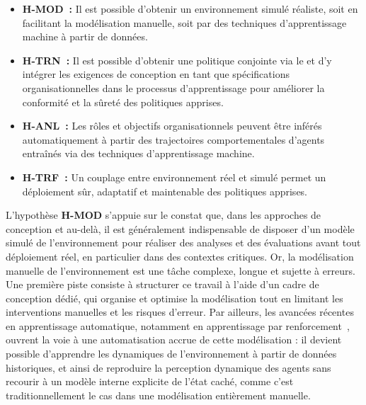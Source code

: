 \begin{itemize}
  \item \textbf{\textbf{H-MOD}~:} Il est possible d'obtenir un environnement simulé réaliste, soit en facilitant la modélisation manuelle, soit par des techniques d'apprentissage machine à partir de données.
  \item \textbf{\textbf{H-TRN}~:} Il est possible d'obtenir une politique conjointe via le  et d'y intégrer les exigences de conception en tant que spécifications organisationnelles dans le processus d'apprentissage pour améliorer la conformité et la sûreté des politiques apprises.
  \item \textbf{\textbf{H-ANL}~:} Les rôles et objectifs organisationnels peuvent être inférés automatiquement à partir des trajectoires comportementales d'agents entraînés via des techniques d'apprentissage machine.
  \item \textbf{\textbf{H-TRF}~:} Un couplage entre environnement réel et simulé permet un déploiement sûr, adaptatif et maintenable des politiques apprises.
\end{itemize}

\noindent L'hypothèse \textbf{H-MOD} s'appuie sur le constat que, dans les approches de conception  et au-delà, il est généralement indispensable de disposer d'un modèle simulé de l'environnement pour réaliser des analyses et des évaluations avant tout déploiement réel, en particulier dans des contextes critiques. Or, la modélisation manuelle de l'environnement est une tâche complexe, longue et sujette à erreurs. Une première piste consiste à structurer ce travail à l'aide d'un cadre de conception dédié, qui organise et optimise la modélisation tout en limitant les interventions manuelles et les risques d'erreur. Par ailleurs, les avancées récentes en apprentissage automatique, notamment en apprentissage par renforcement~\cite{ha2018recurrent}, ouvrent la voie à une automatisation accrue de cette modélisation : il devient possible d'apprendre les dynamiques de l'environnement à partir de données historiques, et ainsi de reproduire la perception dynamique des agents sans recourir à un modèle interne explicite de l'état caché, comme c'est traditionnellement le cas dans une modélisation entièrement manuelle.

\medskip

